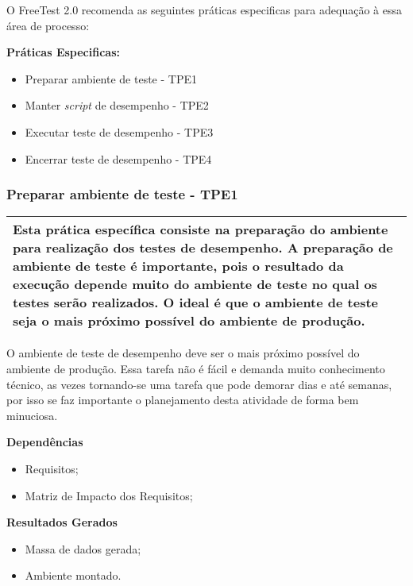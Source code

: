 O FreeTest 2.0 recomenda as seguintes práticas especificas para adequação à essa área de processo:

\textbf{Práticas Especificas:}

\begin{itemize}    
    \item Preparar ambiente de teste - TPE1
    \item Manter \textit{script} de desempenho - TPE2
    \item Executar teste de desempenho - TPE3
    \item Encerrar teste de desempenho - TPE4
\end{itemize}

\subsubsection{Preparar ambiente de teste - TPE1}
\label{sec:tpe1}

\begin{table}[H]
\centering
\begin{tabular}{|p{130mm}|}
\hline
Esta prática específica consiste na preparação do ambiente para realização dos testes de desempenho. A preparação de ambiente de teste é importante, pois o resultado da execução depende muito do ambiente de teste no qual os testes serão realizados. O ideal é que o ambiente de teste seja o mais próximo possível do ambiente de produção.\\ 
\hline
\end{tabular}
\end{table}

O ambiente de teste de desempenho deve ser o mais próximo possível do ambiente de produção. Essa tarefa não é fácil e demanda muito conhecimento técnico, as vezes tornando-se uma tarefa que pode demorar dias e até semanas, por isso se faz importante o planejamento desta atividade de forma bem minuciosa.

\textbf{Dependências}
\begin{itemize}
    \item Requisitos;
    \item Matriz de Impacto dos Requisitos;
\end{itemize}

\textbf{Resultados Gerados}
\begin{itemize}
    \item Massa de dados gerada;
    \item Ambiente montado.
\end{itemize}

